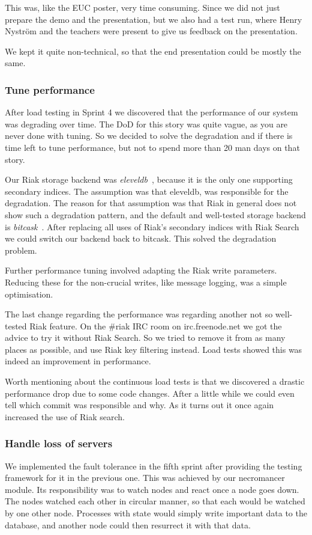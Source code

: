 \documentclass[11pt,a4paper]{report}
\begin{document}
This was, like the EUC poster, very time consuming. Since we did not just
prepare the demo and the presentation, but we also had a test run, where Henry
Nyström and the teachers were present to give us feedback on the presentation.

We kept it quite non-technical, so that the end presentation could be mostly the
same.

\subsubsection{Tune performance}
After load testing in Sprint 4 we discovered that the performance of our system
was degrading over time. The DoD for this story was quite vague, as you are
never done with tuning. So we decided to solve the degradation
and if there is time left to tune performance, but not to spend more than 20 man
days on that story.

Our Riak storage backend was \emph{eleveldb}~\cite{eleveldb}, because it is the only one supporting
secondary indices. The assumption was that eleveldb, was responsible for the
degradation. The reason for that assumption was that Riak in general does not
show such a degradation pattern, and the default and well-tested storage backend
is \emph{bitcask}~\cite{bitcask}. After replacing all uses of Riak's secondary indices with Riak
Search we could switch our backend back to bitcask.  This solved the degradation
problem.

Further performance tuning involved adapting the Riak write parameters.
Reducing these for the non-crucial writes, like message logging, was a simple
optimisation.

The last change regarding the performance was regarding another not so
well-tested Riak feature. On the \#riak IRC room on irc.freenode.net we got
the advice to try it without Riak Search. So we tried to remove it from as
many places as possible, and use Riak key filtering instead.  Load tests showed
this was indeed an improvement in performance.

Worth mentioning about the continuous load tests is that we discovered a drastic
performance drop due to some code changes. After a little while we could even
tell which commit was responsible and why. As it turns out it once again
increased the use of Riak search.

\subsubsection{Handle loss of servers}
We implemented the fault tolerance in the fifth sprint after providing the
testing framework for it in the previous one. This was achieved by our
necromancer module. Its responsibility was to watch nodes and react once a node
goes down. The nodes watched each other in circular manner, so that each would
be watched by one other node. Processes with state would simply write important
data to the database, and another node could then resurrect it with that data.
\end{document}
